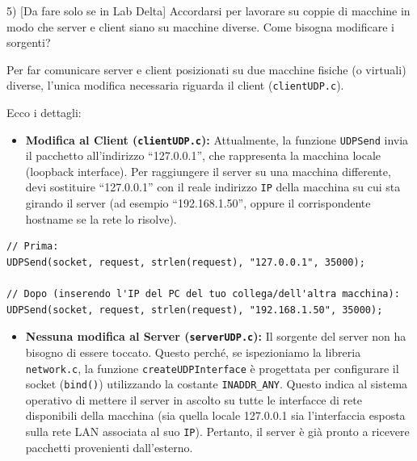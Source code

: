 \documentclass[11pt]{article}
\begin{document}
\begin{tcolorbox}[colback=blue!5!white,colframe=blue!75!black,title=\textbf{DOMANDA}, breakable]
5) [Da fare solo se in Lab Delta] Accordarsi per lavorare su coppie di macchine in modo che server e client siano su macchine diverse. Come bisogna modificare i sorgenti?
\end{tcolorbox}

\begin{tcolorbox}[colback=green!5!white,colframe=green!75!black,title=\textbf{RISPOSTA}, breakable]
Per far comunicare server e client posizionati su due macchine fisiche (o virtuali) diverse, l'unica modifica necessaria riguarda il client (\texttt{clientUDP.c}).

Ecco i dettagli:

\begin{itemize}
    \item \textbf{Modifica al Client (\texttt{clientUDP.c}):}
    Attualmente, la funzione \texttt{UDPSend} invia il pacchetto all'indirizzo ``127.0.0.1'', che rappresenta la macchina locale (loopback interface). Per raggiungere il server su una macchina differente, devi sostituire ``127.0.0.1'' con il reale indirizzo \texttt{IP} della macchina su cui sta girando il server (ad esempio ``192.168.1.50'', oppure il corrispondente hostname se la rete lo risolve).
\end{itemize}

\begin{lstlisting}
// Prima:
UDPSend(socket, request, strlen(request), "127.0.0.1", 35000);

// Dopo (inserendo l'IP del PC del tuo collega/dell'altra macchina):
UDPSend(socket, request, strlen(request), "192.168.1.50", 35000);
\end{lstlisting}

\begin{itemize}
    \item \textbf{Nessuna modifica al Server (\texttt{serverUDP.c}):}
    Il sorgente del server non ha bisogno di essere toccato. Questo perché, se ispezioniamo la libreria \texttt{network.c}, la funzione \texttt{createUDPInterface} è progettata per configurare il socket (\texttt{bind()}) utilizzando la costante \texttt{INADDR\_ANY}. Questo indica al sistema operativo di mettere il server in ascolto su tutte le interfacce di rete disponibili della macchina (sia quella locale 127.0.0.1 sia l'interfaccia esposta sulla rete LAN associata al suo \texttt{IP}). Pertanto, il server è già pronto a ricevere pacchetti provenienti dall'esterno.
\end{itemize}
\end{tcolorbox}
\end{document}
